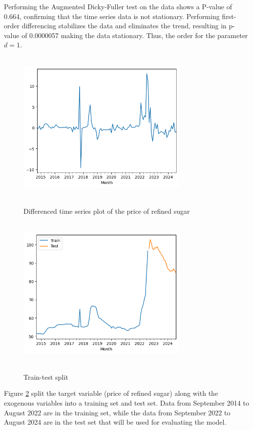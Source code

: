 \documentclass[11pt]{article}
\begin{document}
Performing the Augmented Dicky-Fuller test on the data shows a P-value of 0.664, confirming that the time series data is not stationary. Performing first-order differencing stabilizes the data and eliminates the trend, resulting in p-value of 0.0000057 making the data stationary. Thus, the order for the parameter $d = 1$. 

\begin{figure}[h]
    \caption{Differenced time series plot of the price of refined sugar}
    \centering
    \includegraphics[width = 0.75\textwidth,height = 3in]{differenced.png}
    \label{diff}
\end{figure}

\begin{figure}[h]
    \caption{Train-test split}
    \centering
    \includegraphics[width = 0.75\textwidth,height = 3in]{split.png}
    \label{split}
\end{figure}

Figure \ref{split} split the target variable (price of refined sugar) along with the exogenous variables  into a training set and test set. Data from September 2014 to August 2022 are in the training set, while the data from September 2022 to August 2024 are in the test set that will be used for evaluating the model. 
\end{document}
